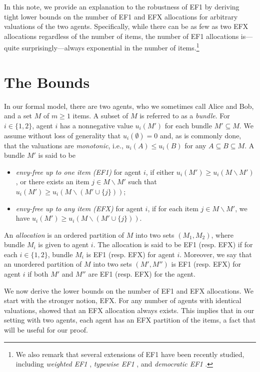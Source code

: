 \documentclass[11pt]{scrartcl}
\theoremstyle{definition}
\begin{document}
In this note, we provide an explanation to the robustness of EF1 by deriving tight lower bounds on the number of EF1 and EFX allocations for arbitrary valuations of the two agents.
Specifically, while there can be as few as two EFX allocations regardless of the number of items, the number of EF1 allocations is---quite surprisingly---always exponential in the number of items.\footnote{We also remark that several extensions of EF1 have been recently studied, including \emph{weighted EF1} \citep{ChakrabortyIgSu20}, \emph{typewise EF1} \citep{BenabbouChEl19}, and \emph{democratic EF1} \citep{SegalhaleviSu19}.}


\section{The Bounds}

In our formal model, there are two agents, who we sometimes call Alice and Bob, and a set $M$ of $m\geq 1$ items. 
A subset of $M$ is referred to as a \emph{bundle}.
For $i\in\{1,2\}$, agent $i$ has a nonnegative value $u_i(M')$ for each bundle $M'\subseteq M$.
We assume without loss of generality that $u_i(\emptyset) = 0$ and, as is commonly done, that the valuations are \emph{monotonic}, i.e., $u_i(A)\leq u_i(B)$ for any $A\subseteq B\subseteq M$.
A bundle $M'$ is said to be
\begin{itemize}
\item \emph{envy-free up to one item (EF1)} for agent $i$, if  either $u_i(M')\geq u_i(M\backslash M')$, or there exists an item $j\in M\backslash M'$ such that $u_i(M') \geq u_i(M\backslash(M'\cup\{j\}))$;
\item \emph{envy-free up to any item (EFX)} for agent $i$, if for each item $j\in M\backslash M'$, we have $u_i(M') \geq u_i(M\backslash(M'\cup\{j\}))$.
\end{itemize}

An \emph{allocation} is an ordered partition of $M$ into two sets $(M_1,M_2)$, where bundle $M_i$ is given to agent $i$.
The allocation is said to be EF1 (resp. EFX) if for each $i\in\{1,2\}$, bundle $M_i$ is EF1 (resp. EFX) for agent $i$.
Moreover, we say that an unordered partition of $M$ into two sets $(M',M'')$ is EF1 (resp. EFX) for agent $i$ if both $M'$ and $M''$ are EF1 (resp. EFX) for the agent.

We now derive the lower bounds on the number of EF1 and EFX allocations.
We start with the stronger notion, EFX.
For any number of agents with identical valuations, \cite{PlautRo18} showed that an EFX allocation always exists.
This implies that in our setting with two agents, each agent has an EFX partition of the items, a fact that will be useful for our proof.
\end{document}
